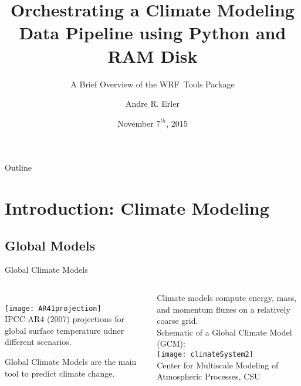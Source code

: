 \documentclass[hyperref={pdfpagelabels=false},compress,final]{beamer}
\title[Orchestrating a Climate Modeling Pipeline]{Orchestrating a Climate Modeling Data Pipeline using Python and RAM Disk}
\subtitle{A Brief Overview of the WRF~Tools Package}
\author[\href{http://www.physics.utoronto.ca/~aerler/}{Andre R. Erler} (\href{mailto:A.R.Erler@gmail.com}{A.R.Erler@gmail.com})]{Andre R. Erler}
\institute{PyCon Canada}
\date{November $7^{th}$, 2015}
\newenvironment{myBox}[3][shadow=true]%
{\begin{center} \begin{minipage}{#2} \begin{beamerboxesrounded}[#1]{#3} \smallskip}%
{\smallskip \end{beamerboxesrounded} \end{minipage} \end{center}}
\begin{document}

\begin{frame}
\titlepage
\end{frame}

\begin{frame}{Outline}
\tableofcontents%
\end{frame}

\section[Introduction]{Introduction: Climate Modeling}




\subsection*{Global Models}

\begin{frame}{\hspace*{0.5\textwidth}Global Climate Models}
 \begin{columns}
   \begin{column}{0.4\textwidth}
     \vspace*{-1cm}\\%
     \texttt{[image: AR41projection]}\\
     {\footnotesize IPCC AR4 (2007) projections for global surface temperature udner different scenarios.} \\ \smallskip
   \begin{myBox}[shadow=true]{0.85\textwidth}{}
     \small Global Climate Models are the main tool to predict climate change.
   \end{myBox}
   \end{column}
   \begin{column}{0.7\textwidth}
     {\footnotesize Climate models compute energy, mass, and momentum fluxes on a relatively coarse grid. \smallskip \\
     Schematic of a Global Climate Model (GCM):} \smallskip \\
     \texttt{[image: climateSystem2]}\\
     {\tiny Center for Multiscale Modeling of Atmospheric Processes, CSU}
   \end{column}
 \end{columns}
\end{frame}
\end{document}
